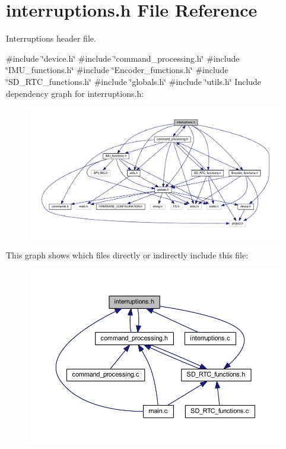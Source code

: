 \section{interruptions.\+h File Reference}
\label{interruptions_8h}


Interruptions header file.  


{\ttfamily \#include \char`\"{}device.\+h\char`\"{}}\newline
{\ttfamily \#include \char`\"{}command\+\_\+processing.\+h\char`\"{}}\newline
{\ttfamily \#include \char`\"{}I\+M\+U\+\_\+functions.\+h\char`\"{}}\newline
{\ttfamily \#include \char`\"{}Encoder\+\_\+functions.\+h\char`\"{}}\newline
{\ttfamily \#include \char`\"{}S\+D\+\_\+\+R\+T\+C\+\_\+functions.\+h\char`\"{}}\newline
{\ttfamily \#include \char`\"{}globals.\+h\char`\"{}}\newline
{\ttfamily \#include \char`\"{}utils.\+h\char`\"{}}\newline
Include dependency graph for interruptions.\+h\+:\nopagebreak
\begin{figure}[H]
\begin{center}
\leavevmode
\includegraphics[width=350pt]{interruptions_8h__incl}
\end{center}
\end{figure}
This graph shows which files directly or indirectly include this file\+:\nopagebreak
\begin{figure}[H]
\begin{center}
\leavevmode
\includegraphics[width=350pt]{interruptions_8h__dep__incl}
\end{center}
\end{figure}
